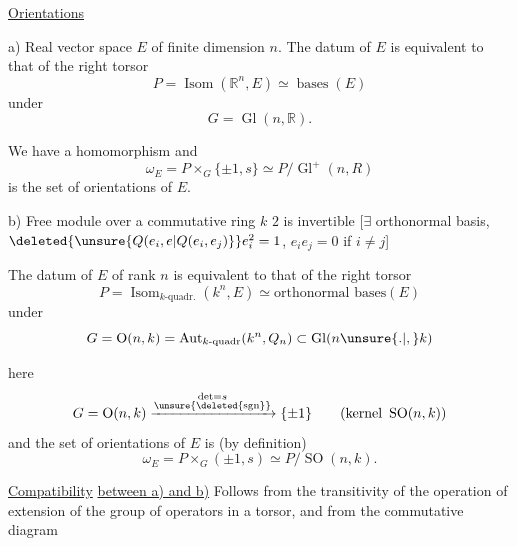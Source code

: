 \uline{Orientations}

a) Real vector space $E$ of finite dimension $n$. The datum of $E$ is equivalent to that of the right torsor
\[
 P=\operatorname{Isom}(\mathbb R^n,E)\simeq\operatorname{bases}(E)
\]
under
\[
 G=\operatorname{Gl}(n,\mathbb R).
\]

We have a homomorphism
and
\[
 \omega_E=P\times_G\{\pm1,s\}\simeq P/\operatorname{Gl}^+(n,R)
\]
is the set of orientations of $E$.

b) Free  module   over a commutative ring $k$  $2$ is invertible [$\exists$ orthonormal basis, $\deleted{\unsure{Q(e_i,e|Q(e_i,e_j)}} e_i^2=1$, $e_i e_j=0$ if $i\ne j$]

The datum of $E$ of rank $n$ is equivalent to that of the right torsor
\[
 P=\operatorname{Isom}_{k\text{-quadr.}}(k^n,E)\simeq\text{orthonormal bases}(E)
\]
under
\[
 G=\operatorname{O}(n,k)=\operatorname{Aut}_{k\text{-quadr}}(k^n,Q_n)\subset\operatorname{Gl}(n\unsure{.|,}k)
\]

 here
\[
 G=\operatorname{O}(n,k)\xrightarrow{\substack{\det=s\\\unsure{\deleted{\operatorname{sgn}}}}}\{\pm1\}\qquad(\text{kernel }\operatorname{SO}(n,k))
\]
and the set of orientations of $E$ is (by definition)
\[
 \omega_E=P\times_G(\pm1,s)\simeq P/\operatorname{SO}(n,k).
\]

\uline{Compatibility} \uline{between a) and b)} Follows from the transitivity of the operation of extension of the group of operators in a torsor, and from the commutative diagram
